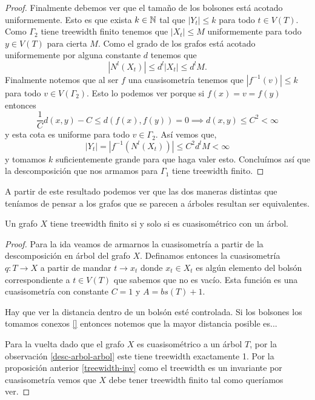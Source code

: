 \documentclass[tesis.tex]{subfiles}
\begin{document}
\begin{proof}
	Finalmente debemos ver que el tamaño de los bolsones está acotado uniformemente.
	Esto es que exista $k \in \mathbb N$ tal que $|Y_t| \le k$ para todo $t \in V(T)$.
	Como $\Gamma_2$ tiene treewidth finito tenemos que $|X_t| \le M$ uniformemente para todo $y \in V(T)$ para cierta $M$. 
	Como el grado de los grafos está acotado uniformemente por alguna constante $d$ tenemos que 
	\[
	|N^l(X_t)| \le d^l |X_t| \le d^l M.
	\]
	Finalmente notemos que al ser $f$ una cuasisometría tenemos que $|f^{-1}(v)| \le k$ para todo $v \in V(\Gamma_2)$.
	Esto lo podemos ver porque si $f(x) = v = f(y)$ entonces
	\[
	\frac{1}{C}d(x,y) - C \le d( f(x), f(y) ) = 0 \implies d(x,y) \le C^2 < \infty
	\]
	y esta cota es uniforme para todo $v \in \Gamma_2$. 
	Así vemos que,
	\[
	|Y_t| = |f^{-1}(N^l(X_t))| \le C^2 d^l M < \infty
	\]
	y tomamos $k$ suficientemente grande para que haga valer esto.
	Concluímos así que la descomposición que nos armamos para $\Gamma_1$ tiene treewidth finito.
\end{proof}

A partir de este resultado podemos ver que las dos maneras distintas que teníamos de pensar a los grafos que se parecen a árboles resultan ser equivalentes.

\begin{prop}
	Un grafo $X$ tiene treewidth finito si y solo si es cuasisométrico con un árbol.
\end{prop}
\begin{proof}
	
Para la ida veamos de armarnos la cuasisometría a partir de la descomposición en árbol del grafo $X$. Definamos entonces la cuasisometría $q: T \to X$ a partir de mandar $t \to x_t$ donde $x_t \in X_t$ es algún elemento del bolsón correspondiente a $t \in V(T)$ que sabemos que no es vacío. Esta función es una cuasisometría con constante $C=1$ y $A = bs(T) + 1$.

Hay que ver la distancia dentro de un bolsón esté controlada.
Si los bolsones los tomamos conexos \ref{} entonces notemos que la mayor distancia posible es...


Para la vuelta dado que el grafo $X$ es cuasisométrico a un árbol $T$, por la observación \ref{desc-arbol-arbol} este tiene treewidth exactamente 1.
Por la proposición anterior \ref{treewidth-inv} como el treewidth es un invariante por cuasisometría vemos que $X$ debe tener treewidth finito tal como queríamos ver.
\end{proof}
\end{document}
